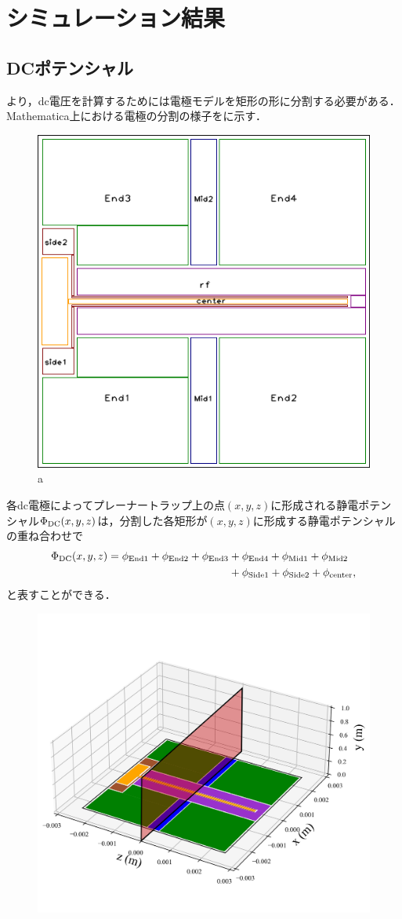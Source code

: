 \chapter{シミュレーション結果}
\section{DCポテンシャル}
より，dc電圧を計算するためには電極モデルを矩形の形に分割する必要がある．Mathematica上における電極の分割の様子をに示す．
\begin{figure}[h]
	\begin{center}
		\includegraphics[width = 0.4\linewidth]{./simulation/figure/named_rect_electrode.png}
	\end{center}
	\caption{a}
	\label{fig:rect_electrode}
\end{figure}
各dc電極によってプレーナートラップ上の点$(x,y,z)$に形成される静電ポテンシャル$\Phi_{\rm DC}(x,y,z)$は，分割した各矩形が$(x,y,z)$に形成する静電ポテンシャルの重ね合わせで
\large
\begin{align}
	\Phi_{\rm DC}(x,y,z) = \phi_{\rm End1} + \phi_{\rm End2} + \phi_{\rm End3} &+ \phi_{\rm End4} + \phi_{\rm Mid1} + \phi_{\rm Mid2} \notag \\
	&+ \phi_{\rm Side1} + \phi_{\rm Side2} + \phi_{\rm center},
\end{align}
\normalsize
と表すことができる．
\begin{figure}[h]
	\begin{center}
		\includegraphics[width = 0.7\linewidth]{./simulation/figure/PlannarTrap_3D_z=0.png}
	\end{center}
\end{figure}
